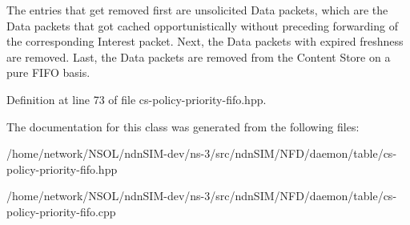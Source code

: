 The entries that get removed first are unsolicited Data packets, which are the Data packets that got cached opportunistically without preceding forwarding of the corresponding Interest packet. Next, the Data packets with expired freshness are removed. Last, the Data packets are removed from the Content Store on a pure F\+I\+FO basis. 

Definition at line 73 of file cs-\/policy-\/priority-\/fifo.\+hpp.



The documentation for this class was generated from the following files\+:\begin{DoxyCompactItemize}
\item 
/home/network/\+N\+S\+O\+L/ndn\+S\+I\+M-\/dev/ns-\/3/src/ndn\+S\+I\+M/\+N\+F\+D/daemon/table/cs-\/policy-\/priority-\/fifo.\+hpp\item 
/home/network/\+N\+S\+O\+L/ndn\+S\+I\+M-\/dev/ns-\/3/src/ndn\+S\+I\+M/\+N\+F\+D/daemon/table/cs-\/policy-\/priority-\/fifo.\+cpp\end{DoxyCompactItemize}
